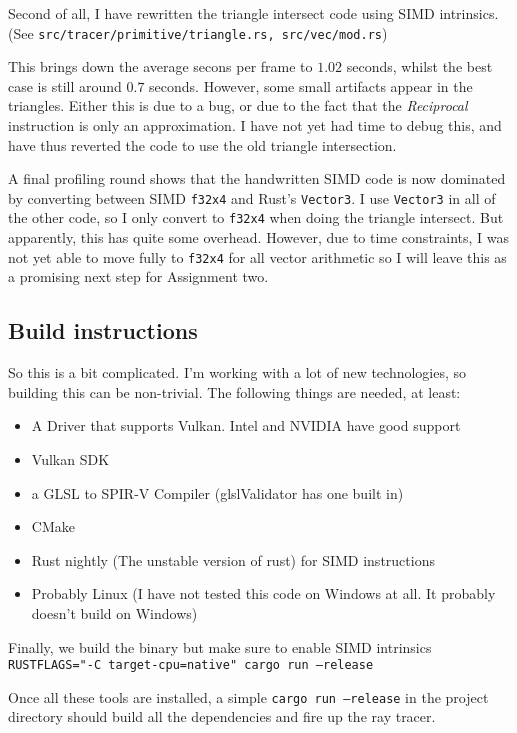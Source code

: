 \documentclass{article}
\begin{document}
Second of all, I have rewritten the triangle intersect code using SIMD intrinsics. (See \texttt{src/tracer/primitive/triangle.rs, src/vec/mod.rs})

This
brings down the average secons per frame to $1.02$ seconds, whilst the best case is still around $0.7$ seconds.
However, some small artifacts appear in the triangles. Either this is due to a bug, or due to the fact that
the \emph{Reciprocal} instruction is only an approximation. I have not yet had time to debug this, and have thus
reverted the code to use the old triangle intersection.

A final profiling round shows that the handwritten SIMD code is now dominated by converting between
SIMD \texttt{f32x4} and Rust's \texttt{Vector3}.  I use \texttt{Vector3} in all of the other code, so
I only convert to \texttt{f32x4} when doing the triangle intersect. But apparently, this has quite some overhead.
However, due to time constraints, I was not yet able to move fully to \texttt{f32x4} for all vector arithmetic so I will leave this as a promising next step for Assignment two.


\subsection{Build instructions}
So this is a bit complicated. I'm working with a lot of new technologies, so building this can be non-trivial.
The following things are needed, at least:
\begin{itemize}
    \item A Driver that supports Vulkan.  Intel and NVIDIA have good support
    \item Vulkan SDK
    \item a GLSL to SPIR-V Compiler (glslValidator has one built in)
    \item CMake
    \item Rust nightly (The unstable version of rust) for SIMD instructions
    \item Probably Linux (I have not tested this code on Windows at all. It probably doesn't build on Windows)
\end{itemize}

Finally, we build the binary but make sure to enable SIMD intrinsics \texttt{
  RUSTFLAGS="-C target-cpu=native" cargo run --release}

Once all these tools are installed,  a simple \texttt{cargo run --release} in the project directory should build
all the dependencies and fire up the ray tracer.
\end{document}
